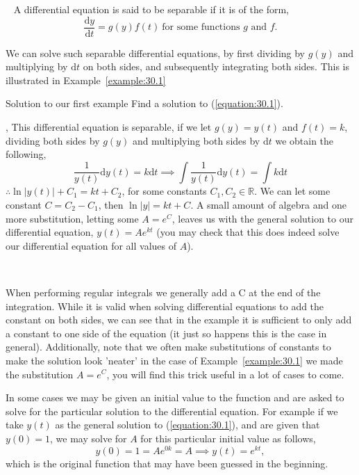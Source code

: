 \documentclass[../../main.tex]{subfiles}
\begin{document}
\begin{definition}{~}
A differential equation is said to be separable if it is of the form,
$$\frac{\mathrm{d}y}{\mathrm{d}t}=g(y)f(t) \ \text{for some functions $g$ and $f$.}$$
\end{definition}

We can solve such separable differential equations, by first dividing by $g(y)$ and multiplying by $\mathrm{d}t$ on both sides, and subsequently integrating both sides. This is illustrated in Example~\ref{example:30.1}

\begin{example}{Solution to our first example}\label{example:30.1}
Find a solution to (\ref{equation:30.1}).

\sep
This differential equation is separable, if we let $g(y)=y(t)$ and $f(t)=k$, dividing both sides by $g(y)$ and multiplying both sides by $\mathrm{d}t$ we obtain the following,
$$\frac{1}{y(t)}\mathrm{d}y(t)=k\mathrm{d}t \implies \int\frac{1}{y(t)}\mathrm{d}y(t)=\int k \mathrm{d}t$$
$\therefore \ln{|y(t)|}+C_{1}=kt+C_{2}$, for some constants $C_{1},C_{2} \in \mathbb{R}$. We can let some constant $C=C_{2}-C_{1}$, then $\ln{|y|}=kt+C$. A small amount of algebra and one more substitution, letting some $A=e^C$, leaves us with the general solution to our differential equation, $y(t)=Ae^{kt}$ (you may check that this does indeed solve our differential equation for all values of $A$).
\end{example}

\begin{insight}{~}

When performing regular integrals we generally add a C at the end of the integration. While it is valid when solving differential equations to add the constant on both sides, we can see that in the example it is sufficient to only add a constant to one side of the equation (it just so happens this is the case in general). Additionally, note that we often make substitutions of constants to make the solution look 'neater' in the case of Example~\ref{example:30.1} we made the substitution $A=e^C$, you will find this trick useful in a lot of cases to come.
\end{insight}

In some cases we may be given an initial value to the function and are asked to solve for the particular solution to the differential equation. For example if we take $y(t)$ as the general solution to (\ref{equation:30.1}), and are given that $y(0)=1$, we may solve for $A$ for this particular initial value as follows,
$$y(0)=1=Ae^{0k}=A \implies y(t)=e^{kt},$$
which is the original function that may have been guessed in the beginning.
\end{document}
